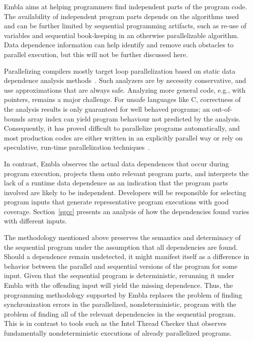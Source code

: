 \documentclass[times, 10pt,twocolumn]{article}
\begin{document}
Embla aims at helping programmers find independent parts of the 
program code.  The availability of independent program parts depends on
the algorithms used and can be further
limited by sequential programming artifacts, such as re-use of
variables and sequential book-keeping in an otherwise parallelizable
algorithm.  Data dependence information can help
identify and remove such obstacles to parallel execution, but this
will not be further discussed here.

Parallelizing compilers mostly target loop parallelization based on
static data dependence analysis methods~\cite{KA02}.  Such analyzers
are by necessity conservative, and use approximations that are always
safe.  Analyzing more general code, e.g., with pointers, remains a
major challenge. For unsafe languages like C, correctness of the
analysis results is only guaranteed for well behaved programs; an
out-of-bounds array index can yield program behaviour not predicted by
the analysis. Consequently, it has proved difficult to parallelize
programs automatically, and most production codes are either written
in an explicitly parallel way or rely on speculative, run-time
parallelization techniques~\cite{PO03,CL03}.

In contrast, Embla
observes the actual data dependences that occur during program
execution, projects them onto relevant program parts, and interprets the
lack of a runtime data dependence as an indication that the program
parts involved are likely to be independent.
Developers will be responsible for selecting
program inputs that generate representative program executions with
good coverage. Section~\ref{sgcc} presents an analysis of how the
dependencies found varies with different inputs.

The methodology mentioned above preserves the
semantics and determinacy of the sequential program under the
assumption that all dependencies are found.  Should a dependence
remain undetected, it might manifest itself as a difference in
behavior between the parallel and sequential versions of the program
for some input. Given that the sequential program is deterministic,
rerunning it under Embla with the offending input will yield the
missing dependence.  Thus, the programming methodology supported by
Embla replaces the problem of finding synchronization errors in the
parallelized, nondeterministic, program with the problem of finding
all of the relevant dependencies in the sequential program.
This is in contrast to tools such as the Intel Thread Checker that
observes fundamentally nondeterministic executions of already 
parallelized programs.
\end{document}
